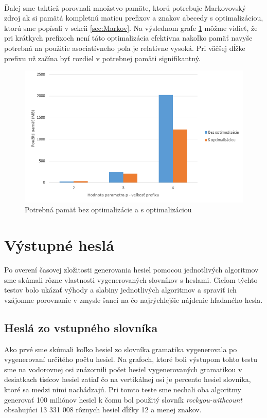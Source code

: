 \paragraph{}
Ďalej sme taktiež porovnali množstvo pamäte, ktorú potrebuje Markovovský zdroj ak si pamätá kompletnú maticu prefixov a znakov abecedy s optimalizáciou, ktorú sme popísali v sekcii \ref{sec:Markov}. Na výslednom grafe \ref{fig:memOptimization} môžme vidieť, že pri krátkych prefixoch není táto optimalizácia efektívna nakoľko pamäť navyše potrebná na použitie asociatívneho poľa je relatívne vysoká. Pri väčšej dĺžke prefixu už začína byť rozdiel v potrebnej pamäti signifikantný.

\begin{figure}[ht]
    \centering
    \includegraphics[width=1\textwidth]{memOptimize}
    \caption{Potrebná pamäť bez optimalizácie a s optimalizáciou}
    \label{fig:memOptimization}
\end{figure}

\section{Výstupné heslá}
\label{sec:pass}
Po overení časovej zložitosti generovania hesiel pomocou jednotlivých algoritmov sme skúmali rôzne vlastnosti vygenerovaných slovníkov s heslami. Cieľom týchto testov bolo ukázať výhody a slabiny jednotlivých algoritmov a spraviť ich vzájomne porovnanie v zmysle šancí na čo najrýchlejšie nájdenie hľadaného hesla.

\subsection{Heslá zo vstupného slovníka}
Ako prvé sme skúmali koľko hesiel zo slovníka gramatika vygenerovala po vygenerovaní určitého počtu hesiel. Na grafoch, ktoré boli výstupom tohto testu sme na vodorovnej osi znázornili počet hesiel vygenerovaných gramatikou v desiatkach tisícov hesiel zatiaľ čo na vertikálnej osi je percento hesiel slovníka, ktoré sa medzi nimi nachádzajú. Pri tomto teste sme nechali oba algoritmy generovať 100 miliónov hesiel k čomu bol použitý slovník \emph{rockyou-withcount} obsahujúci 13 331 008 rôznych hesiel dĺžky 12 a menej znakov.

